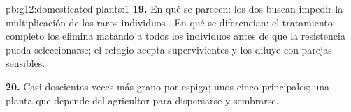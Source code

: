 \begin{solution}{pb:g12:domesticated-plants:1}
\textbf{19.} En qué se parecen: los dos buscan impedir la
multiplicación de los raros individuos . En qué se
diferencian: el tratamiento completo los elimina matando a todos los
individuos antes de que la resistencia pueda seleccionarse; el refugio
acepta supervivientes y los diluye con parejas sensibles.

\textbf{20.} Casi doscientas veces más grano por espiga; unos cinco
 principales; una planta que depende del agricultor para
dispersarse y sembrarse.
\end{solution}

